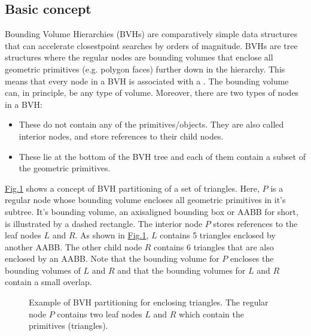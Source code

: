 \documentclass[letterpaper,10pt,english]{sphinxmanual}
\let\sphinxpxdimen\pdfpxdimen\else\newdimen\sphinxpxdimen
\begin{document}
\subsection{Basic concept}
\label{\detokenize{BVH:basic-concept}}
\sphinxAtStartPar
Bounding Volume Hierarchies (BVHs) are comparatively simple data structures that can accelerate closest\sphinxhyphen{}point searches by orders of magnitude.
BVHs are tree structures where the regular nodes are bounding volumes that enclose all geometric primitives (e.g. polygon faces) further down in the hierarchy.
This means that every node in a BVH is associated with a .
The bounding volume can, in principle, be any type of volume.
Moreover, there are two types of nodes in a BVH:
\begin{itemize}
\item {} 
\sphinxAtStartPar
{} These do not contain any of the primitives/objects.
They are also called interior nodes, and store references to their child nodes.

\item {} 
\sphinxAtStartPar
{} These lie at the bottom of the BVH tree and each of them contain a subset of the geometric primitives.

\end{itemize}

\sphinxAtStartPar
\hyperref[\detokenize{BVH:fig-trianglesbvh}]{Fig.\@ \ref{\detokenize{BVH:fig-trianglesbvh}}} shows a concept of BVH partitioning of a set of triangles.
Here, \(P\) is a regular node whose bounding volume encloses all geometric primitives in it’s subtree.
It’s bounding volume, an axis\sphinxhyphen{}aligned bounding box or AABB for short, is illustrated by a dashed rectangle.
The interior node \(P\) stores references to the leaf nodes \(L\) and \(R\).
As shown in \hyperref[\detokenize{BVH:fig-trianglesbvh}]{Fig.\@ \ref{\detokenize{BVH:fig-trianglesbvh}}}, \(L\) contains 5 triangles enclosed by another AABB.
The other child node \(R\) contains 6 triangles that are also enclosed by an AABB.
Note that the bounding volume for \(P\) encloses the bounding volumes of \(L\) and \(R\) and that the bounding volumes for \(L\) and \(R\) contain a small overlap.

\begin{figure}[htbp]
\centering
\capstart

\noindent\sphinxincludegraphics[width=480\sphinxpxdimen]{{TrianglesBVH}.png}
\caption{Example of BVH partitioning for enclosing triangles. The regular node \(P\) contains two leaf nodes \(L\) and \(R\) which contain the primitives (triangles).}\label{\detokenize{BVH:id1}}\label{\detokenize{BVH:fig-trianglesbvh}}\end{figure}
\end{document}
